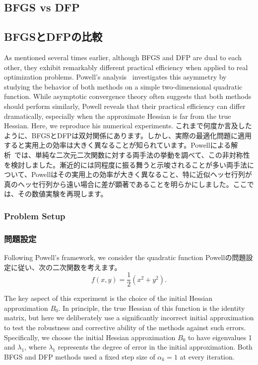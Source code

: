 \documentclass[0_main]{subfiles}
\begin{document}
\ifEn
    \subsection{BFGS vs DFP}
\else
    \subsection{BFGSとDFPの比較}
\fi

\ifEn
    As mentioned several times earlier, although BFGS and DFP are dual to each other, they exhibit remarkably different practical efficiency when applied to real optimization problems. Powell's analysis~\citep{powellHowBadAre1986} investigates this asymmetry by studying the behavior of both methods on a simple two-dimensional quadratic function. While asymptotic convergence theory often suggests that both methods should perform similarly, Powell reveals that their practical efficiency can differ dramatically, especially when the approximate Hessian is far from the true Hessian. Here, we reproduce his numerical experiments.
\else
    これまで何度か言及したように、BFGSとDFPは双対関係にあります。しかし、実際の最適化問題に適用すると実用上の効率は大きく異なることが知られています。Powellによる解析~\citep{powellHowBadAre1986}では、単純な二次元二次関数に対する両手法の挙動を調べて、この非対称性を検討しました。漸近的には同程度に振る舞うと示唆されることが多い両手法について、Powellはその実用上の効率が大きく異なること、特に近似ヘッセ行列が真のヘッセ行列から遠い場合に差が顕著であることを明らかにしました。ここでは、その数値実験を再現します。
\fi

\ifEn
    \subsubsection{Problem Setup}
\else
    \subsubsection{問題設定}
\fi

\ifEn
    Following Powell's framework, we consider the quadratic function
\else
    Powellの問題設定に従い、次の二次関数を考えます。
\fi
\begin{equation*}
    f(x, y) = \frac{1}{2}(x^2 + y^2).
\end{equation*}

\ifEn
    The key aspect of this experiment is the choice of the initial Hessian approximation $B_0$. In principle, the true Hessian of this function is the identity matrix, but here we deliberately use a significantly incorrect initial approximation to test the robustness and corrective ability of the methods against such errors. Specifically, we choose the initial Hessian approximation $B_0$ to have eigenvalues 1 and $\lambda_1$, where $\lambda_1$ represents the degree of error in the initial approximation. Both BFGS and DFP methods used a fixed step size of $\alpha_k = 1$ at every iteration.
\end{document}
